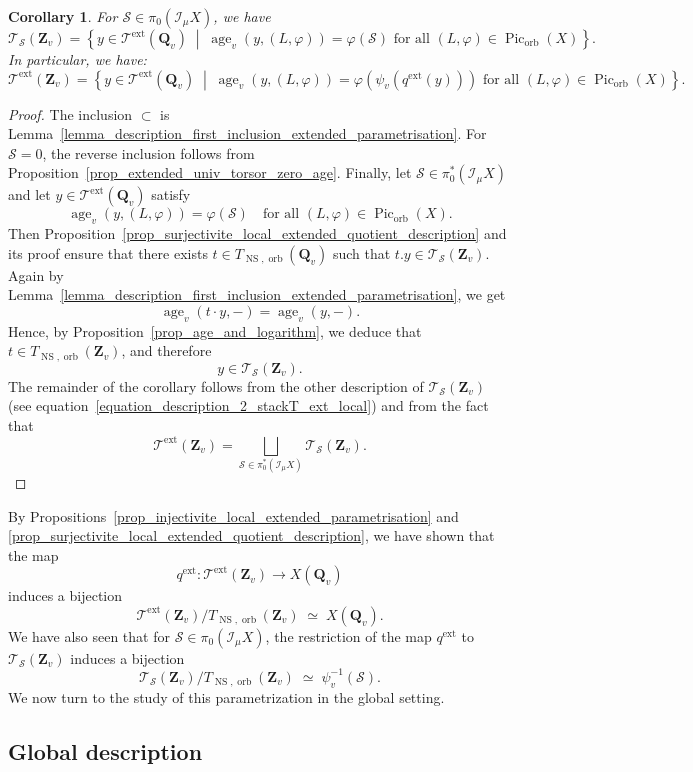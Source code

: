 \documentclass{proc-l}
\newcommand{\Z}{\mathbf{Z}}
\newcommand{\Q}{\mathbf{Q}}
\DeclareMathOperator{\Pic}{Pic}
\DeclareMathOperator{\age}{age}
\DeclareMathOperator{\NS}{NS}
\DeclareMathOperator{\orb}{orb}
\DeclareMathOperator{\ext}{ext}
\newcommand{\stackS}{\mathcal{S}}
\newcommand{\stackT}{\mathcal{T}}
\newcommand{\sheafI}{\mathcal{I}}
\newcommand{\sector}{\pi_0(\sheafI_{\mu} X)}
\newcommand{\twistsector}{\pi_0^*(\sheafI_{\mu} X)}
\newtheorem{cor}[theorem]{Corollary}
\theoremstyle{definition}
\theoremstyle{remark}
\numberwithin{equation}{section}
\begin{document}
\begin{cor}\label{corollary_computation_extended_parametrization}
For $\stackS\in\sector$, we have
\[
\stackT_{\stackS}(\Z_v) =
\left\{
y\in\stackT^{\ext}(\Q_v)\;\middle|\;
\age_v(y,(L,\varphi))=\varphi(\stackS)
\text{ for all } (L,\varphi)\in\Pic_{\orb}(X)
\right\}.
\]In particular, we have:
\[
\stackT^{\ext}(\Z_v) =
\left\{
y\in\stackT^{\ext}(\Q_v)\;\middle|\;
\age_v(y,(L,\varphi))=\varphi\left(\psi_v\left(q^{\ext}(y)\right)\right)
\text{ for all } (L,\varphi)\in\Pic_{\orb}(X)
\right\}.
\]
\end{cor}

\begin{proof}
The inclusion $\subset$ is Lemma~\ref{lemma_description_first_inclusion_extended_parametrisation}. 
For $\stackS=0$, the reverse inclusion follows from 
Proposition~\ref{prop_extended_univ_torsor_zero_age}. Finally, let $\stackS\in\twistsector$ and let 
$y\in\stackT^{\ext}(\Q_v)$ satisfy
\[
\age_v(y,(L,\varphi))=\varphi(\stackS)
\quad \text{for all } (L,\varphi)\in\Pic_{\orb}(X).
\]
Then Proposition~\ref{prop_surjectivite_local_extended_quotient_description}
and its proof ensure that there exists 
$t\in T_{\NS,\orb}(\Q_v)$ such that 
$t.y\in\stackT_{\stackS}(\Z_v)$. Again by Lemma~\ref{lemma_description_first_inclusion_extended_parametrisation}, we get
$$
\age_v(t \cdot y,-) = \age_v(y,-).
$$Hence, by Proposition~\ref{prop_age_and_logarithm}, we deduce that $t \in T_{\NS,\orb}(\Z_v)$, and therefore
$$y \in \stackT_{\stackS}(\Z_v).$$The remainder of the corollary follows from the other description of $\stackT_{\stackS}(\Z_v)$ (see equation~\ref{equation_description_2_stackT_ext_local}) and from the fact that
$$
\stackT^{\ext}(\Z_v)
=
\bigsqcup\limits_{\stackS \in \twistsector}
\stackT_{\stackS}(\Z_v).
$$
\end{proof}

By Propositions~\ref{prop_injectivite_local_extended_parametrisation} and
\ref{prop_surjectivite_local_extended_quotient_description}, we have shown that the
map
\[
q^{\ext} : \stackT^{\ext}(\Z_v) \longrightarrow X(\Q_v)
\]
induces a bijection
\[
\stackT^{\ext}(\Z_v) / T_{\NS,\orb}(\Z_v)
\;\simeq\;
X(\Q_v).
\]We have also seen that for $\stackS \in \sector$, the restriction of the map
$q^{\ext}$ to $\stackT_{\stackS}(\Z_v)$ induces a bijection
\[
\stackT_{\stackS}(\Z_v) / T_{\NS,\orb}(\Z_v)
\;\simeq\;
\psi_v^{-1}(\stackS).
\]We now turn to the study of this parametrization in the global setting.


\subsection{Global description}
\end{document}

